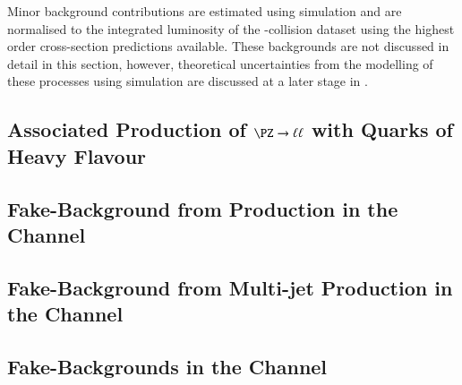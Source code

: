 Minor background contributions are estimated using simulation and are
normalised to the integrated luminosity of the \pp-collision dataset
using the highest order cross-section predictions available. These
backgrounds are not discussed in detail in this section, however,
theoretical uncertainties from the modelling of these processes using
simulation are discussed at a later stage in
.

\subsection{Associated Production of $\PZ \to \ell\ell$ with Quarks of Heavy Flavour}%
\label{sec:bkg_zjets}


\subsection{Fake-\tauhadvis Background from \ttbar Production in the \hadhad Channel}%
\label{sec:bkg_hadhad_ttbarfakes}


\subsection{Fake-\tauhadvis Background from Multi-jet Production in the \hadhad Channel}%
\label{sec:bkg_hadhad_ff}


\subsection{Fake-\tauhadvis Backgrounds in the \lephad Channel}%
\label{sec:bkg_lephad_combined_ff}



